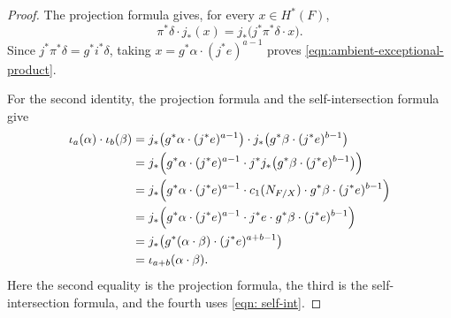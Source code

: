 \documentclass[11pt, reqno]{amsart}
\theoremstyle{definition}
\begin{document}
\begin{proof}
The projection formula gives, for every $x\in H^*(F)$,
\[
\pi^*\delta\cdot j_*(x)
=
j_*\bigl(j^*\pi^*\delta\cdot x\bigr).
\]
Since $j^*\pi^*\delta=g^*i^*\delta$, taking
$x=g^*\alpha\cdot(j^*e)^{a-1}$ proves
\eqref{eqn:ambient-exceptional-product}.

For the second identity, the projection formula and the
self-intersection formula give
\[
\begin{aligned}
\iota_a(\alpha)\cdot\iota_b(\beta)
&=
j_*\bigl(g^*\alpha\cdot(j^*e)^{a-1}\bigr)
\cdot
j_*\bigl(g^*\beta\cdot(j^*e)^{b-1}\bigr)
\\
&=
j_*\Bigl(
g^*\alpha\cdot(j^*e)^{a-1}
\cdot
j^*j_*\bigl(g^*\beta\cdot(j^*e)^{b-1}\bigr)
\Bigr)
\\
&=
j_*\Bigl(
g^*\alpha\cdot(j^*e)^{a-1}
\cdot
c_1(N_{F/X})
\cdot
g^*\beta\cdot(j^*e)^{b-1}
\Bigr)
\\
&=
j_*\Bigl(
g^*\alpha\cdot(j^*e)^{a-1}
\cdot
j^*e
\cdot
g^*\beta\cdot(j^*e)^{b-1}
\Bigr)
\\
&=
j_*\bigl(
g^*(\alpha\cdot\beta)\cdot(j^*e)^{a+b-1}
\bigr)
\\
&=
\iota_{a+b}(\alpha\cdot\beta).
\end{aligned}
\]
Here the second equality is the projection formula, the third is the
self-intersection formula, and the fourth uses
\eqref{eqn: self-int}.
\end{proof}
\end{document}

